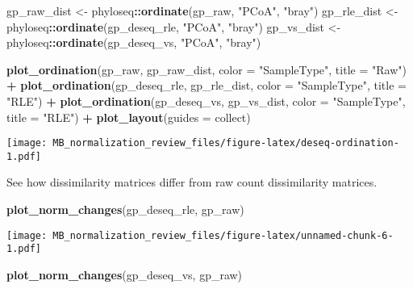 \documentclass[
]{book}
\newenvironment{Shaded}{\begin{snugshade}}{\end{snugshade}}
\newcommand{\DataTypeTok}[1]{\textcolor[rgb]{0.13,0.29,0.53}{#1}}
\newcommand{\KeywordTok}[1]{\textcolor[rgb]{0.13,0.29,0.53}{\textbf{#1}}}
\newcommand{\NormalTok}[1]{#1}
\newcommand{\OperatorTok}[1]{\textcolor[rgb]{0.81,0.36,0.00}{\textbf{#1}}}
\newcommand{\StringTok}[1]{\textcolor[rgb]{0.31,0.60,0.02}{#1}}
\begin{document}
\begin{Shaded}
\begin{Highlighting}[]
\NormalTok{gp\_raw\_dist \textless{}{-}}\StringTok{ }\NormalTok{phyloseq}\OperatorTok{::}\KeywordTok{ordinate}\NormalTok{(gp\_raw, }\StringTok{"PCoA"}\NormalTok{, }\StringTok{"bray"}\NormalTok{) }
\NormalTok{gp\_rle\_dist \textless{}{-}}\StringTok{ }\NormalTok{phyloseq}\OperatorTok{::}\KeywordTok{ordinate}\NormalTok{(gp\_deseq\_rle, }\StringTok{"PCoA"}\NormalTok{, }\StringTok{"bray"}\NormalTok{) }
\NormalTok{gp\_vs\_dist \textless{}{-}}\StringTok{ }\NormalTok{phyloseq}\OperatorTok{::}\KeywordTok{ordinate}\NormalTok{(gp\_deseq\_vs, }\StringTok{"PCoA"}\NormalTok{, }\StringTok{"bray"}\NormalTok{) }

\KeywordTok{plot\_ordination}\NormalTok{(gp\_raw, gp\_raw\_dist, }\DataTypeTok{color =} \StringTok{"SampleType"}\NormalTok{, }\DataTypeTok{title =} \StringTok{"Raw"}\NormalTok{) }\OperatorTok{+}\StringTok{ }
\KeywordTok{plot\_ordination}\NormalTok{(gp\_deseq\_rle, gp\_rle\_dist, }\DataTypeTok{color =} \StringTok{"SampleType"}\NormalTok{, }\DataTypeTok{title =} \StringTok{"RLE"}\NormalTok{) }\OperatorTok{+}
\KeywordTok{plot\_ordination}\NormalTok{(gp\_deseq\_vs, gp\_vs\_dist, }\DataTypeTok{color =} \StringTok{"SampleType"}\NormalTok{, }\DataTypeTok{title =} \StringTok{"RLE"}\NormalTok{) }\OperatorTok{+}\StringTok{ }
\StringTok{  }\KeywordTok{plot\_layout}\NormalTok{(}\DataTypeTok{guides =} \StringTok{\textquotesingle{}collect\textquotesingle{}}\NormalTok{)}
\end{Highlighting}
\end{Shaded}

\texttt{[image: MB\_normalization\_review\_files/figure-latex/deseq-ordination-1.pdf]}

See how dissimilarity matrices differ from raw count dissimilarity matrices.

\begin{Shaded}
\begin{Highlighting}[]
\KeywordTok{plot\_norm\_changes}\NormalTok{(gp\_deseq\_rle, gp\_raw)}
\end{Highlighting}
\end{Shaded}

\texttt{[image: MB\_normalization\_review\_files/figure-latex/unnamed-chunk-6-1.pdf]}

\begin{Shaded}
\begin{Highlighting}[]
\KeywordTok{plot\_norm\_changes}\NormalTok{(gp\_deseq\_vs, gp\_raw)}
\end{Highlighting}
\end{Shaded}
\end{document}
